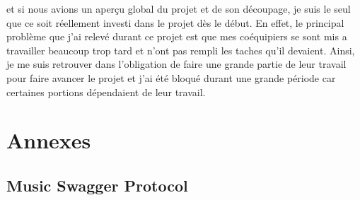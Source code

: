 \documentclass[12pt]{article}
\begin{document}
	
	
	et si nous avions un aperçu global du projet et de son découpage, je suis le seul que ce soit réellement investi dans le projet dès le début. En effet, le principal problème que j'ai relevé durant ce projet est que mes coéquipiers se sont mis a travailler beaucoup trop tard et n'ont pas rempli les taches qu'il devaient. Ainsi, je me suis retrouver dans l'obligation de faire une grande partie de leur travail pour faire avancer le projet et j'ai été bloqué durant une grande période car certaines portions dépendaient de leur travail.
	
	\newpage
	\section*{Annexes}
	\subsection*{Music Swagger Protocol}
	\inputminted[breaklines]{text}{MusicSwaggerProtocol.txt}
	\newpage
\end{document}
